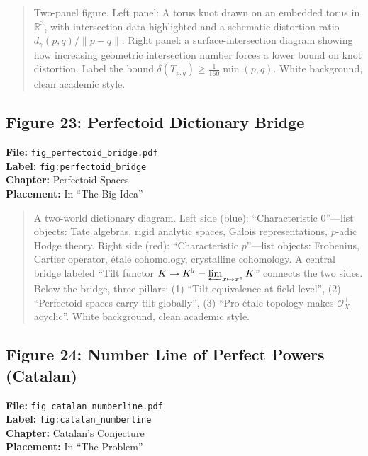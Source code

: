 \begin{quote}
Two-panel figure. Left panel: A torus knot drawn on an embedded torus in $\mathbb{R}^3$, with intersection data highlighted and a schematic distortion ratio $d_\gamma(p,q)/\lVert p-q\rVert$. Right panel: a surface-intersection diagram showing how increasing geometric intersection number forces a lower bound on knot distortion. Label the bound $\delta(T_{p,q})\geq \frac1{160}\min(p,q)$. White background, clean academic style.
\end{quote}

\subsection*{Figure 23: Perfectoid Dictionary Bridge}
\textbf{File:} \texttt{fig\_perfectoid\_bridge.pdf} \\
\textbf{Label:} \texttt{fig:perfectoid\_bridge} \\
\textbf{Chapter:} Perfectoid Spaces \\
\textbf{Placement:} In ``The Big Idea''

\begin{quote}
A two-world dictionary diagram. Left side (blue): ``Characteristic 0''---list objects: Tate algebras, rigid analytic spaces, Galois representations, $p$-adic Hodge theory. Right side (red): ``Characteristic $p$''---list objects: Frobenius, Cartier operator, \'etale cohomology, crystalline cohomology. A central bridge labeled ``Tilt functor $K \to K^\flat = \varprojlim_{x \mapsto x^p} K$'' connects the two sides. Below the bridge, three pillars: (1) ``Tilt equivalence at field level'', (2) ``Perfectoid spaces carry tilt globally'', (3) ``Pro-\'etale topology makes $\mathcal{O}_X^+$ acyclic''. White background, clean academic style.
\end{quote}

\subsection*{Figure 24: Number Line of Perfect Powers (Catalan)}
\textbf{File:} \texttt{fig\_catalan\_numberline.pdf} \\
\textbf{Label:} \texttt{fig:catalan\_numberline} \\
\textbf{Chapter:} Catalan's Conjecture \\
\textbf{Placement:} In ``The Problem''

